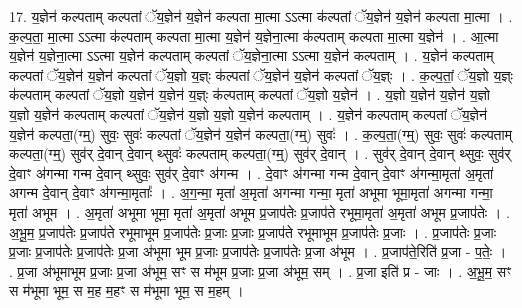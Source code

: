 \documentclass[17pt]{extarticle}
\begin{document}
17. य॒ज्ञेन॑ कल्पताम् कल्पतां ॅय॒ज्ञेन॑ य॒ज्ञेन॑ कल्पता मा॒त्मा ऽऽत्मा क॑ल्पतां ॅय॒ज्ञेन॑ य॒ज्ञेन॑ कल्पता मा॒त्मा । . क॒ल्प॒ता॒ मा॒त्मा ऽऽत्मा क॑ल्पताम् कल्पता मा॒त्मा य॒ज्ञेन॑ य॒ज्ञेना॒त्मा क॑ल्पताम् कल्पता मा॒त्मा य॒ज्ञेन॑ । . आ॒त्मा य॒ज्ञेन॑ य॒ज्ञेना॒त्मा ऽऽत्मा य॒ज्ञेन॑ कल्पताम् कल्पतां ॅय॒ज्ञेना॒त्मा ऽऽत्मा य॒ज्ञेन॑ कल्पताम् । . य॒ज्ञेन॑ कल्पताम् कल्पतां ॅय॒ज्ञेन॑ य॒ज्ञेन॑ कल्पतां ॅय॒ज्ञो य॒ज्ञ्ः क॑ल्पतां ॅय॒ज्ञेन॑ य॒ज्ञेन॑ कल्पतां ॅय॒ज्ञ्ः । . क॒ल्प॒तां॒ ॅय॒ज्ञो य॒ज्ञ्ः क॑ल्पताम् कल्पतां ॅय॒ज्ञो य॒ज्ञेन॑ य॒ज्ञेन॑ य॒ज्ञ्ः क॑ल्पताम् कल्पतां ॅय॒ज्ञो य॒ज्ञेन॑ । . य॒ज्ञो य॒ज्ञेन॑ य॒ज्ञेन॑ य॒ज्ञो य॒ज्ञो य॒ज्ञेन॑ कल्पताम् कल्पतां ॅय॒ज्ञेन॑ य॒ज्ञो य॒ज्ञो य॒ज्ञेन॑ कल्पताम् । . य॒ज्ञेन॑ कल्पताम् कल्पतां ॅय॒ज्ञेन॑ य॒ज्ञेन॑ कल्पता॒(ग्म्॒) सुवः॒ सुवः॑ कल्पतां ॅय॒ज्ञेन॑ य॒ज्ञेन॑ कल्पता॒(ग्म्॒) सुवः॑ । . क॒ल्प॒ता॒(ग्म्॒) सुवः॒ सुवः॑ कल्पताम् कल्पता॒(ग्म्॒) सुव॑र् दे॒वान् दे॒वान् थ्सुवः॑ कल्पताम् कल्पता॒(ग्म्॒) सुव॑र् दे॒वान् । . सुव॑र् दे॒वान् दे॒वान् थ्सुवः॒ सुव॑र् दे॒वाꣳ अ॑गन्मा गन्म दे॒वान् थ्सुवः॒ सुव॑र् दे॒वाꣳ अ॑गन्म । . दे॒वाꣳ अ॑गन्मा गन्म दे॒वान् दे॒वाꣳ अ॑गन्मा॒मृता॑ अ॒मृता॑ अगन्म दे॒वान् दे॒वाꣳ अ॑गन्मा॒मृताः᳚ । . अ॒ग॒न्मा॒ मृता॑ अ॒मृता॑ अगन्मा गन्मा॒ मृता॑ अभूमा भूमा॒मृता॑ अगन्मा गन्मा॒ मृता॑ अभूम । . अ॒मृता॑ अभूमा भूमा॒ मृता॑ अ॒मृता॑ अभूम प्र॒जाप॑तेः प्र॒जाप॑ते रभूमा॒मृता॑ अ॒मृता॑ अभूम प्र॒जाप॑तेः । . अ॒भू॒म॒ प्र॒जाप॑तेः प्र॒जाप॑ते रभूमाभूम प्र॒जाप॑तेः प्र॒जाः प्र॒जाः प्र॒जाप॑ते रभूमाभूम प्र॒जाप॑तेः प्र॒जाः । . प्र॒जाप॑तेः प्र॒जाः प्र॒जाः प्र॒जाप॑तेः प्र॒जाप॑तेः प्र॒जा अ॑भूमा भूम प्र॒जाः प्र॒जाप॑तेः प्र॒जाप॑तेः प्र॒जा अ॑भूम । . प्र॒जाप॑ते॒रिति॑ प्र॒जा - प॒तेः॒ । . प्र॒जा अ॑भूमाभूम प्र॒जाः प्र॒जा अ॑भूम॒ सꣳ स म॑भूम प्र॒जाः प्र॒जा अ॑भूम॒ सम् । . प्र॒जा इति॑ प्र - जाः । . अ॒भू॒म॒ सꣳ स म॑भूमा भूम॒ स म॒ह म॒हꣳ स म॑भूमा भूम॒ स म॒हम् । \newline
\end{document}
